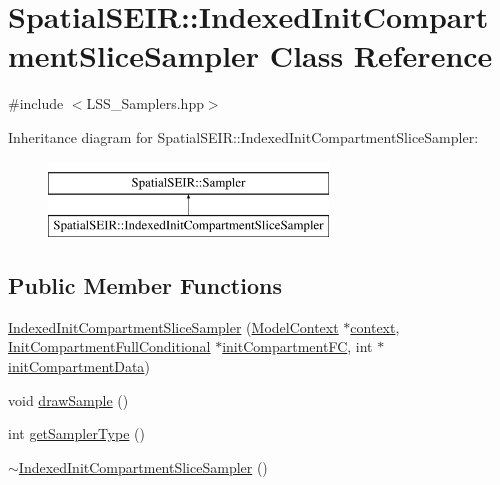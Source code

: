 \hypertarget{classSpatialSEIR_1_1IndexedInitCompartmentSliceSampler}{\section{Spatial\-S\-E\-I\-R\-:\-:Indexed\-Init\-Compartment\-Slice\-Sampler Class Reference}
\label{classSpatialSEIR_1_1IndexedInitCompartmentSliceSampler}
}


{\ttfamily \#include $<$L\-S\-S\-\_\-\-Samplers.\-hpp$>$}

Inheritance diagram for Spatial\-S\-E\-I\-R\-:\-:Indexed\-Init\-Compartment\-Slice\-Sampler\-:\begin{figure}[H]
\begin{center}
\leavevmode
\includegraphics[height=2.000000cm]{classSpatialSEIR_1_1IndexedInitCompartmentSliceSampler}
\end{center}
\end{figure}
\subsection*{Public Member Functions}
\begin{DoxyCompactItemize}
\item 
\hyperlink{classSpatialSEIR_1_1IndexedInitCompartmentSliceSampler_aab73b27c283b18841da79a500f29fdeb}{Indexed\-Init\-Compartment\-Slice\-Sampler} (\hyperlink{classSpatialSEIR_1_1ModelContext}{Model\-Context} $\ast$\hyperlink{classSpatialSEIR_1_1IndexedInitCompartmentSliceSampler_aeaa9d7c11d3bb0000f236c95a2c8f041}{context}, \hyperlink{classSpatialSEIR_1_1InitCompartmentFullConditional}{Init\-Compartment\-Full\-Conditional} $\ast$\hyperlink{classSpatialSEIR_1_1IndexedInitCompartmentSliceSampler_a729e2d6ea861584920909fc54d3094f0}{init\-Compartment\-F\-C}, int $\ast$\hyperlink{classSpatialSEIR_1_1IndexedInitCompartmentSliceSampler_a8660c84e839a34b1a53cb16b9b53f66f}{init\-Compartment\-Data})
\item 
void \hyperlink{classSpatialSEIR_1_1IndexedInitCompartmentSliceSampler_a2ff3fc36c3cfc5b49c58234376ba0a1b}{draw\-Sample} ()
\item 
int \hyperlink{classSpatialSEIR_1_1IndexedInitCompartmentSliceSampler_a8687c4d1acc384cc4e8d7f4b91db79a5}{get\-Sampler\-Type} ()
\item 
\hyperlink{classSpatialSEIR_1_1IndexedInitCompartmentSliceSampler_ab7e3dd539f1d6f66cfbd7de31a10fbce}{$\sim$\-Indexed\-Init\-Compartment\-Slice\-Sampler} ()
\end{DoxyCompactItemize}
